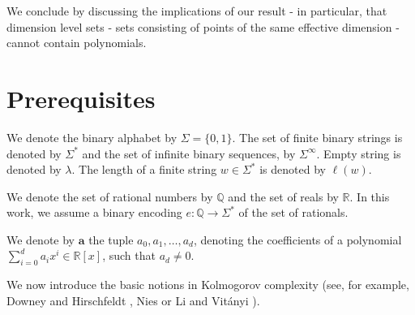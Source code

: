 \documentclass[a4paper,UKenglish,cleveref,autoref,thm-restate]{lipics-v2021}
\newcommand{\Q}{\mathbb{Q}}
\newcommand{\R}{\mathbb{R}}
\begin{document}
We conclude by discussing the implications of our result - in
particular, that dimension level sets - sets consisting of points of the same effective dimension - cannot contain polynomials. 




\section{Prerequisites}
We denote the binary alphabet by $\Sigma=\{0,1\}$. The set of finite binary strings is denoted by $\Sigma^*$ and the set of infinite binary sequences, by $\Sigma^\infty$. Empty string is denoted by $\lambda$. The length of a finite string $w\in\Sigma^*$ is denoted by $\ell(w)$. 

We denote the set of rational numbers by $\Q$ and the set of reals by $\R$. In this work, we assume a binary encoding $e:\Q \to \Sigma^*$ of the set of rationals. 

We denote by $\mathbf{a}$ the tuple $a_0,a_1,\ldots,a_d$, denoting the coefficients of a polynomial $\sum_{i=0}^da_ix^i\in\mathbb{R}[x]$, such that $a_d\ne0$. 

We now introduce the basic notions in Kolmogorov complexity (see, for example, Downey and Hirschfeldt \cite{Downey2008}, Nies \cite{Nies2009} or Li and Vit\'{a}nyi \cite{Li2019}). 
\end{document}
